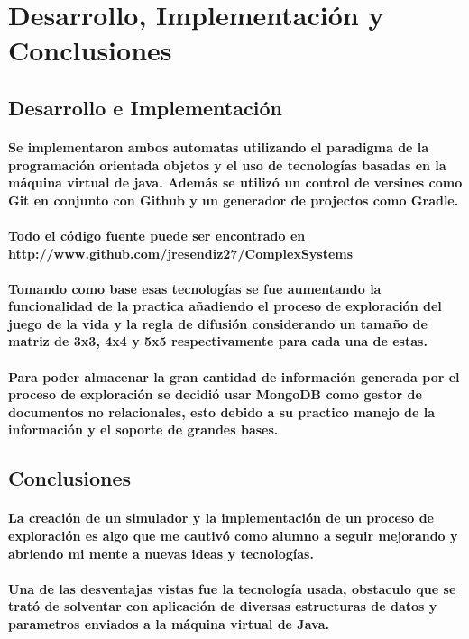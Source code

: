 \section{Desarrollo, Implementación y Conclusiones} 
\subsection{Desarrollo e Implementación} 
	\paragraph{Se implementaron ambos automatas utilizando el paradigma de la programación orientada objetos y el uso de tecnologías basadas en la máquina virtual de java. Además se utilizó un control de versines como Git en conjunto con Github y un generador de projectos como Gradle.}
	\paragraph{
		Todo el código fuente puede ser encontrado en http://www.github.com/jresendiz27/ComplexSystems
	}
	\paragraph{
		Tomando como base esas tecnologías se fue aumentando la funcionalidad de la practica añadiendo el proceso de exploración del juego de la vida y la regla de difusión considerando un tamaño de matriz de 3x3, 4x4 y 5x5 respectivamente para cada una de estas.
	}
	\paragraph{
		Para poder almacenar la gran cantidad de información generada por el proceso de exploración se decidió usar MongoDB como gestor de documentos no relacionales, esto debido a su practico manejo de la información y el soporte de grandes bases.
	}
\subsection{Conclusiones}
	\paragraph{
		La creación de un simulador y la implementación de un proceso de exploración es algo que me cautivó como alumno a seguir mejorando y abriendo mi mente a nuevas ideas y tecnologías. 
	}
	\paragraph{
		Una de las desventajas vistas fue la tecnología usada, obstaculo que se trató de solventar con aplicación de diversas estructuras de datos y parametros enviados a la máquina virtual de Java.
	}
